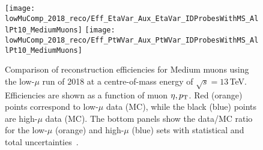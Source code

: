 	\begin{figure}
		\centering
		\texttt{[image: lowMuComp\_2018\_reco/Eff\_EtaVar\_Aux\_EtaVar\_IDProbesWithMS\_AllPt10\_MediumMuons]}%
	\texttt{[image: lowMuComp\_2018\_reco/Eff\_PtWVar\_Aux\_PtWVar\_IDProbesWithMS\_AllPt10\_MediumMuons]}
	
		\caption{Comparison of reconstruction efficiencies for Medium muons
			using the low-$\mu$ run of 2018 at a centre-of-mass energy of
			$\sqrt{s}=13\,$TeV. Efficiencies are
			shown as a function of muon $\eta, p_{\text{T}}$. Red (orange) points correspond to low-$\mu$ data (MC),
			while the black (blue) points are high-$\mu$ data (MC). The bottom
			panels show the data/MC ratio for the low-$\mu$ (orange) and
			high-$\mu$ (blue) sets with statistical and total
			uncertainties~\cite{int_note_muons}.}\label{app:fig:lowMu2}
	\end{figure}
	

